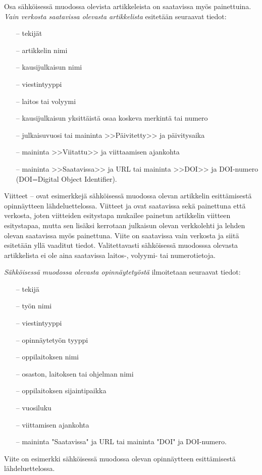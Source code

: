 \documentclass[finnish, 12pt, a4paper, elec, utf8, a-2b, online]{aaltothesis}
\begin{document}
\noindent
Osa sähköisessä muodossa olevista artikkeleista on saatavissa myös
painettuina. \textit{Vain verkosta saatavissa olevasta artikkelista} esitetään
seuraavat tiedot:
\begin{itemize}
	\setlength{\itemsep}{-3pt}
	\item[--]tekijät
	\item[--]artikkelin nimi
	\item[--]kausijulkaisun nimi
	\item[--]viestintyyppi
	\item[--]laitos tai volyymi
	\item[--]kausijulkaisun yksittäistä osaa koskeva merkintä tai numero
	\item[--]julkaisuvuosi tai maininta >>Päivitetty>> ja päivitysaika
	\item[--]maininta >>Viitattu>> ja viittaamisen ajankohta 
	\item[--]maininta >>Saatavissa>> ja URL tai 
	maininta >>DOI>> ja DOI-numero (DOI=Digital Object Identifier).
\end{itemize}
Viitteet \cite{Ribeiro}--\cite{kone} ovat esimerkkejä sähköisessä muodossa 
olevan artikkelin esittämisestä opinnäytteen lähdeluettelossa. Viitteet 
\cite{Ribeiro} ja \cite{Stieber} ovat saatavissa sekä painettuna että verkosta, 
joten viitteiden esitystapa mukailee painetun artikkelin viitteen esitystapaa, 
mutta sen lisäksi kerrotaan julkaisun olevan verkkolehti ja lehden olevan 
saatavissa myös painettuna.  Viite \cite{kone} on saatavissa vain verkosta ja
siitä esitetään yllä vaaditut tiedot. Valitettavasti sähköisessä muodosssa 
olevasta artikkelista ei ole aina saatavissa lai\-tos-, volyymi- tai 
numerotietoja.

\noindent
\textit{Sähköisessä muodossa olevasta opinnäytetyöstä} ilmoitetaan
seuraavat tiedot:
\begin{itemize}
	\setlength{\itemsep}{-3pt}
	\item[--]tekijä
	\item[--]työn nimi
	\item[--]viestintyyppi
	\item[--]opinnäytetyön tyyppi
	\item[--]oppilaitoksen nimi
	\item[--]osaston, laitoksen tai ohjelman nimi
	\item[--]oppilaitoksen sijaintipaikka
	\item[--]vuosiluku
	\item[--]viittamisen ajankohta
	\item[--]maininta "Saatavissa" ja URL tai 
	maininta "DOI" ja DOI-numero.
\end{itemize}
Viite \cite{Adida} on esimerkki sähköisessä muodossa olevan opinnäytteen 
esittämisestä lähdeluettelossa.
\end{document}
